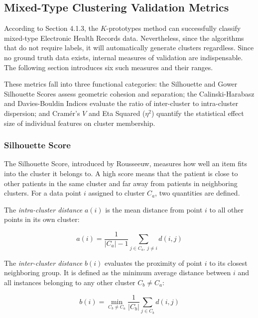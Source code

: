\subsection{Mixed-Type Clustering Validation Metrics}

According to Section 4.1.3, the $K$-prototypes method can successfully classify mixed-type Electronic Health Records data. Nevertheless, since the algorithms that do not require labels, it will automatically generate clusters regardless. Since no ground truth data exists, internal measures of validation are indispensable. The following section introduces six such measures and their ranges.

These metrics fall into three functional categories: the Silhouette and Gower Silhouette Scores assess geometric cohesion and separation; the Calinski-Harabasz and Davies-Bouldin Indices evaluate the ratio of inter-cluster to intra-cluster dispersion; and Cramér's $V$ and Eta Squared ($\eta^2$) quantify the statistical effect size of individual features on cluster membership.

\subsubsection*{Silhouette Score}

The Silhouette Score, introduced by Rousseeuw\cite{rousseeuw1987}, measures how well an item fits into the cluster it belongs to. A high score means that the patient is close to other patients in the same cluster and far away from patients in neighboring clusters. For a data point $i$ assigned to cluster $C_a$, two quantities are defined.

\vspace{1em}

The \emph{intra-cluster distance} $a(i)$ is the mean distance from point $i$ to all other points in its own cluster:

\begin{equation}
    a(i) = \frac{1}{|C_a| - 1} \sum_{j \in C_a,\; j \neq i} d(i, j)
    \label{eq:silhouette_a}
\end{equation}

\vspace {1em}

The \emph{inter-cluster distance} $b(i)$ evaluates the proximity of point $i$ to its closest neighboring group. It is defined as the minimum average distance between $i$ and all instances belonging to any other cluster $C_b \neq C_a$:

\begin{equation}
    b(i) = \min_{C_b \neq C_a} \frac{1}{|C_b|} \sum_{j \in C_b} d(i, j)
    \label{eq:silhouette_b}
\end{equation}

